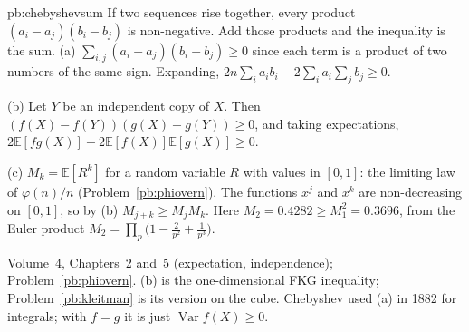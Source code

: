 \begin{solution}{pb:chebyshevsum}
\idea If two sequences rise together, every product $(a_i-a_j)(b_i-b_j)$ is non-negative. Add those products and the inequality is the sum.
\writeup (a) $\sum_{i,j}(a_i-a_j)(b_i-b_j)\ge0$ since each term is a product of two numbers of the same sign. Expanding,
$2n\sum_ia_ib_i-2\sum_ia_i\sum_jb_j\ge0$.

(b) Let $Y$ be an independent copy of $X$. Then $(f(X)-f(Y))(g(X)-g(Y))\ge0$, and taking expectations,
$2\mathbb E[fg(X)]-2\mathbb E[f(X)]\mathbb E[g(X)]\ge0$.

(c) $M_k=\mathbb E[R^k]$ for a random variable $R$ with values in $[0,1]$: the limiting law of $\varphi(n)/n$ (Problem~\ref{pb:phiovern}). The functions
$x^j$ and $x^k$ are non-decreasing on $[0,1]$, so by (b) $M_{j+k}\ge M_jM_k$. Here $M_2=0.4282\ge M_1^2=0.3696$, from the Euler product $M_2=\prod_p\bigl(1-\frac2{p^2}+\frac1{p^3}\bigr)$.

\tools Volume~4, Chapters~2 and~5 (expectation, independence); Problem~\ref{pb:phiovern}.
\leads (b) is the one-dimensional FKG inequality; Problem~\ref{pb:kleitman} is its version on the cube. Chebyshev used (a) in
1882 for integrals; with $f=g$ it is just $\operatorname{Var}f(X)\ge0$.
\end{solution}

